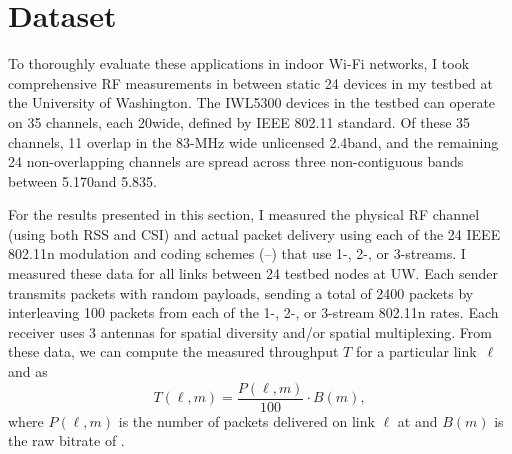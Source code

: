 \section{Dataset}
To thoroughly evaluate these applications in indoor Wi-Fi networks, I took comprehensive RF measurements in between static 24 devices in my testbed at the University of Washington. 
The IWL5300 devices in the testbed can operate on 35 channels, each 20\MHz wide, defined by IEEE 802.11 standard. Of these 35 channels, 11 overlap in the 83-MHz wide unlicensed 2.4\GHz band, and the remaining 24 non-overlapping channels are spread across three non-contiguous bands between 5.170\GHz and 5.835\GHz.

For the results presented in this section, I measured the physical RF channel (using both RSS and CSI) and actual packet delivery using each of the 24 IEEE 802.11n modulation and coding schemes (--) that use  1-, 2-, or 3-streams. I measured these data for all links between 24 testbed nodes at UW\@. Each sender transmits packets with random payloads, sending a total of 2400 packets by interleaving 100 packets from each of the 1-, 2-, or 3-stream 802.11n rates. Each receiver uses 3 antennas for spatial diversity and/or spatial multiplexing. From these data, we can compute the measured throughput $T$ for a particular link~$\ell$ and  as
\begin{equation}
	\label{eq:prr_throughput}
	T(\ell,m) = \frac{P(\ell,m)}{100} \cdot B(m),
\end{equation}
where $P(\ell,m)$ is the number of packets delivered on link $\ell$ at  and $B(m)$ is the raw bitrate of .